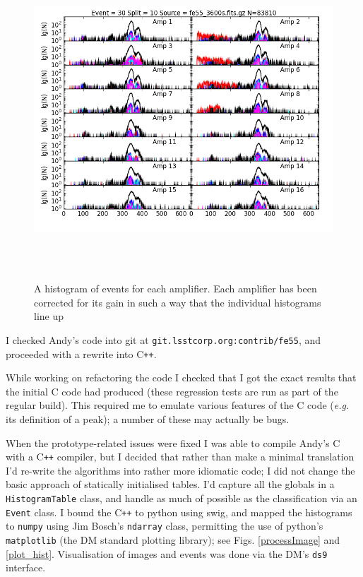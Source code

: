 \documentclass[12pt]{article}
\newcommand{\CPP}{C\texttt{++}\xspace}  %
\begin{document}
\begin{figure}
  \hspace*{-10mm}\includegraphics[height=12cm]{fe55-gain-perAmp}
  \caption{A histogram of events for each amplifier.  Each amplifier has been corrected for its gain in
    such a way that the individual histograms line up
  }
  \label{eventsHistogramPerAmp}
\end{figure}

I checked Andy's code into git at \texttt{git\@git.lsstcorp.org:contrib/fe55}, and proceeded
with a rewrite into \CPP.

While working on refactoring the code I checked that I got the exact results that the initial C code had
produced (these regression tests are run as part of the regular build).  This required me to emulate various
features of the C code (\textit{e.g.} its definition of a peak); a number of
these may actually be bugs.

When the prototype-related issues were fixed I was able to compile Andy's C with a \CPP compiler, but I decided
that rather than make a minimal translation I'd re-write the algorithms into rather more idiomatic code;
I did not change the basic approach of statically initialised tables.  I'd
capture all the globals in a \texttt{HistogramTable} class, and handle as much of possible as the
classification via an \texttt{Event} class.  I bound the \CPP to python using swig, and mapped the histograms
to \texttt{numpy} using Jim Bosch's \texttt{ndarray} class, permitting the use of python's \texttt{matplotlib}
(the DM standard plotting library); see Figs. \ref{processImage} and \ref{plot_hist}.  Visualisation of images
and events was done via the DM's \texttt{ds9} interface.
\end{document}
